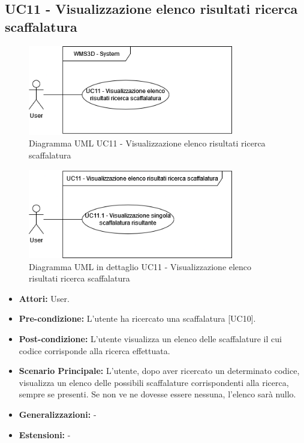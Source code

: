 \subsection{UC11 - Visualizzazione elenco risultati ricerca scaffalatura}
\begin{figure}[H]
  \centering
  \includegraphics[width=0.8\textwidth]{UC_diagrams_11-20/UC11_sys.drawio.png}
   \caption{Diagramma UML UC11 - Visualizzazione elenco risultati ricerca scaffalatura}
\end{figure}
\begin{figure}[H]
  \centering
  \includegraphics[width=0.8\textwidth]{UC_diagrams_11-20/UC11.drawio.png}
   \caption{Diagramma UML in dettaglio UC11 - Visualizzazione elenco risultati ricerca scaffalatura}
\end{figure}
\begin{itemize}
    \item \textbf{Attori:} User.
    \item \textbf{Pre-condizione:} L'utente ha ricercato una scaffalatura [UC10].
    \item \textbf{Post-condizione:} L'utente visualizza un elenco delle scaffalature il cui codice corrisponde alla ricerca effettuata.
    \item \textbf{Scenario Principale:} L'utente, dopo aver ricercato un determinato codice, visualizza un elenco delle possibili scaffalature corrispondenti alla ricerca, sempre se presenti. Se non ve ne dovesse essere nessuna, l'elenco sarà nullo.
    \item \textbf{Generalizzazioni:} -
    \item \textbf{Estensioni:} -
\end{itemize}


